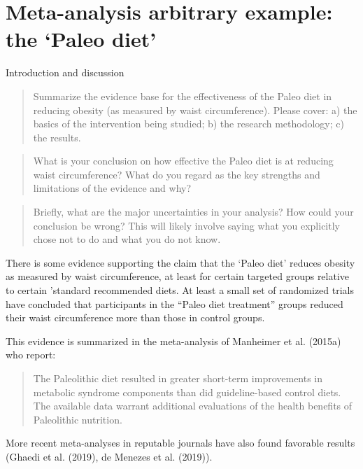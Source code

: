 \documentclass[]{tufte-handout}
\date{}
\begin{document}
\hypertarget{paleo-example}{%
\section{Meta-analysis arbitrary example: the `Paleo
diet'}\label{paleo-example}}

Introduction and discussion

\begin{quote}
Summarize the evidence base for the effectiveness of the Paleo diet in
reducing obesity (as measured by waist circumference). Please cover: a)
the basics of the intervention being studied; b) the research
methodology; c) the results.
\end{quote}

\begin{quote}
What is your conclusion on how effective the Paleo diet is at reducing
waist circumference? What do you regard as the key strengths and
limitations of the evidence and why?
\end{quote}

\begin{quote}
Briefly, what are the major uncertainties in your analysis? How could
your conclusion be wrong? This will likely involve saying what you
explicitly chose not to do and what you do not know.
\end{quote}

There is some evidence supporting the claim that the `Paleo diet'
reduces obesity as measured by waist circumference, at least for certain
targeted groups relative to certain 'standard recommended diets. At
least a small set of randomized trials have concluded that participants
in the ``Paleo diet treatment'' groups reduced their waist circumference
more than those in control groups.

This evidence is summarized in the meta-analysis of Manheimer et al.
(2015a) who report:

\begin{quote}
The Paleolithic diet resulted in greater short-term improvements in
metabolic syndrome components than did guideline-based control diets.
The available data warrant additional evaluations of the health benefits
of Paleolithic nutrition.
\end{quote}

More recent meta-analyses in reputable journals have also found
favorable results (Ghaedi et al. (2019), de Menezes et al. (2019)).

\end{document}
